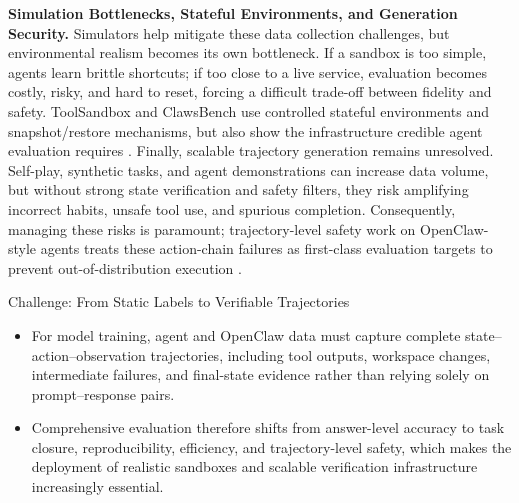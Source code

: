 \textbf{Simulation Bottlenecks, Stateful Environments, and Generation Security.} Simulators help mitigate these data collection challenges, but environmental realism becomes its own bottleneck. If a sandbox is too simple, agents learn brittle shortcuts; if too close to a live service, evaluation becomes costly, risky, and hard to reset, forcing a difficult trade-off between fidelity and safety. ToolSandbox and ClawsBench use controlled stateful environments and snapshot/restore mechanisms, but also show the infrastructure credible agent evaluation requires \citep{lu2024toolsandbox,li2026clawsbench}. Finally, scalable trajectory generation remains unresolved. Self-play, synthetic tasks, and agent demonstrations can increase data volume, but without strong state verification and safety filters, they risk amplifying incorrect habits, unsafe tool use, and spurious completion. Consequently, managing these risks is paramount; trajectory-level safety work on OpenClaw-style agents treats these action-chain failures as first-class evaluation targets to prevent out-of-distribution execution \citep{yang2026atbenchclaw,wei2026clawsafety,liu2026clawkeeper,greshake2023not,liu2024formalizing,yi2025benchmarking}.


\begin{AIbox}{Challenge: From Static Labels to Verifiable Trajectories}
    \begin{itemize}[left=2pt,topsep=1pt,itemsep=2pt, parsep=1pt]
\item For model training, agent and OpenClaw data must capture complete state--action--observation trajectories, including tool outputs, workspace changes, intermediate failures, and final-state evidence rather than relying solely on prompt--response pairs.

\item Comprehensive evaluation therefore shifts from answer-level accuracy to task closure, reproducibility, efficiency, and trajectory-level safety, which makes the deployment of realistic sandboxes and scalable verification infrastructure increasingly essential.
    \end{itemize}
\end{AIbox}
